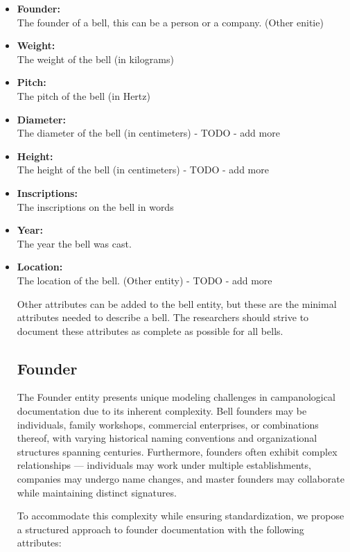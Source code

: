 \documentclass[11pt, a4paper]{article}
\begin{document}
\begin{itemize}
    \item \textbf{Founder:} \\
        The founder of a bell, this can be a person or a company. (Other enitie)
    \item \textbf{Weight:} \\
        The weight of the bell (in kilograms)
    \item \textbf{Pitch:} \\
        The pitch of the bell (in Hertz)
    \item \textbf{Diameter:} \\
        The diameter of the bell (in centimeters) - TODO - add more
    \item \textbf{Height:} \\
        The height of the bell (in centimeters) - TODO - add more
    \item \textbf{Inscriptions:} \\
        The inscriptions on the bell in words
    \item \textbf{Year:} \\
        The year the bell was cast.
    \item \textbf{Location:} \\
        The location of the bell. (Other entity) - TODO - add more

Other attributes can be added to the bell entity, but these are the minimal attributes needed to describe a bell. The researchers should strive 
to document these attributes as complete as possible for all bells.

\subsection{Founder}

The Founder entity presents unique modeling challenges in campanological documentation due to its inherent complexity. 
Bell founders may be individuals, family workshops, commercial enterprises, or combinations thereof, with varying historical 
naming conventions and organizational structures spanning centuries. Furthermore, founders often exhibit complex 
relationships — individuals may work under multiple establishments, companies may undergo name changes, and master founders 
may collaborate while maintaining distinct signatures.

To accommodate this complexity while ensuring standardization, we propose a structured approach to founder documentation with the following attributes:


\end{itemize}
\end{document}
